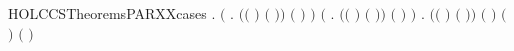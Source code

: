 \begin{SaveVerbatim}{HOLCCSTheoremsPARXXcases}
\HOLTokenTurnstile{} \HOLSymConst{\HOLTokenForall{}}   .
        \HOLSymConst{\ensuremath{\mid}}  \HOLTokenTransBegin{}\HOLTokenTransEnd {} \HOLSymConst{\HOLTokenImp{}}
       \ensuremath{(}\HOLSymConst{\HOLTokenExists{}}  .
            \ensuremath{(}\ensuremath{(} \HOLSymConst{\ensuremath{=}} \ensuremath{)} \HOLSymConst{\HOLTokenConj{}} \ensuremath{(} \HOLSymConst{\ensuremath{=}} \ensuremath{)}\ensuremath{)} \HOLSymConst{\HOLTokenConj{}} \ensuremath{(} \HOLSymConst{\ensuremath{=}}  \HOLSymConst{\ensuremath{\mid}} \ensuremath{)} \HOLSymConst{\HOLTokenConj{}}  \HOLTokenTransBegin{}\HOLTokenTransEnd {}\ensuremath{)} \HOLSymConst{\HOLTokenDisj{}}
       \ensuremath{(}\HOLSymConst{\HOLTokenExists{}}  .
            \ensuremath{(}\ensuremath{(} \HOLSymConst{\ensuremath{=}} \ensuremath{)} \HOLSymConst{\HOLTokenConj{}} \ensuremath{(} \HOLSymConst{\ensuremath{=}} \ensuremath{)}\ensuremath{)} \HOLSymConst{\HOLTokenConj{}} \ensuremath{(} \HOLSymConst{\ensuremath{=}}  \HOLSymConst{\ensuremath{\mid}} \ensuremath{)} \HOLSymConst{\HOLTokenConj{}}  \HOLTokenTransBegin{}\HOLTokenTransEnd {}\ensuremath{)} \HOLSymConst{\HOLTokenDisj{}}
       \HOLSymConst{\HOLTokenExists{}}    .
           \ensuremath{(}\ensuremath{(} \HOLSymConst{\ensuremath{=}} \ensuremath{)} \HOLSymConst{\HOLTokenConj{}} \ensuremath{(} \HOLSymConst{\ensuremath{=}} \ensuremath{)}\ensuremath{)} \HOLSymConst{\HOLTokenConj{}} \ensuremath{(} \HOLSymConst{\ensuremath{=}} \HOLConst{\ensuremath{\tau}}\ensuremath{)} \HOLSymConst{\HOLTokenConj{}} \ensuremath{(} \HOLSymConst{\ensuremath{=}}  \HOLSymConst{\ensuremath{\mid}} \ensuremath{)} \HOLSymConst{\HOLTokenConj{}}
            \HOLTokenTransBegin{} \HOLTokenTransEnd {} \HOLSymConst{\HOLTokenConj{}}  \HOLTokenTransBegin{} \ensuremath{(} \ensuremath{)}\HOLTokenTransEnd {}
\end{SaveVerbatim}
